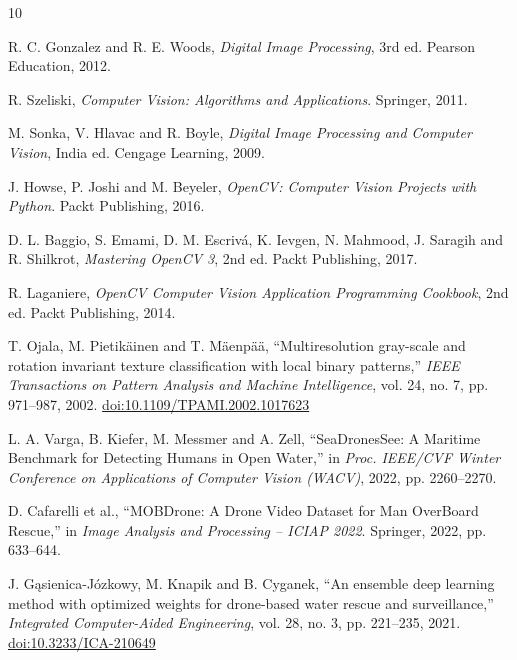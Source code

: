 \documentclass[11pt,a4paper]{article}
\begin{document}
\begin{thebibliography}{10}

 R. C. Gonzalez and R. E. Woods, \emph{Digital Image Processing}, 3rd ed. Pearson Education, 2012.

 R. Szeliski, \emph{Computer Vision: Algorithms and Applications}. Springer, 2011.

 M. Sonka, V. Hlavac and R. Boyle, \emph{Digital Image Processing and Computer Vision}, India ed. Cengage Learning, 2009.

 J. Howse, P. Joshi and M. Beyeler, \emph{OpenCV: Computer Vision Projects with Python}. Packt Publishing, 2016.

 D. L. Baggio, S. Emami, D. M. Escriv\'a, K. Ievgen, N. Mahmood, J. Saragih and R. Shilkrot, \emph{Mastering OpenCV 3}, 2nd ed. Packt Publishing, 2017.

 R. Laganiere, \emph{OpenCV Computer Vision Application Programming Cookbook}, 2nd ed. Packt Publishing, 2014.

 T. Ojala, M. Pietik\"ainen and T. M\"aenp\"a\"a, ``Multiresolution gray-scale and rotation invariant texture classification with local binary patterns,'' \emph{IEEE Transactions on Pattern Analysis and Machine Intelligence}, vol. 24, no. 7, pp. 971--987, 2002. \href{https://doi.org/10.1109/TPAMI.2002.1017623}{doi:10.1109/TPAMI.2002.1017623}

 L. A. Varga, B. Kiefer, M. Messmer and A. Zell, ``SeaDronesSee: A Maritime Benchmark for Detecting Humans in Open Water,'' in \emph{Proc. IEEE/CVF Winter Conference on Applications of Computer Vision (WACV)}, 2022, pp. 2260--2270.

 D. Cafarelli et al., ``MOBDrone: A Drone Video Dataset for Man OverBoard Rescue,'' in \emph{Image Analysis and Processing -- ICIAP 2022}. Springer, 2022, pp. 633--644.

 J. G\k{a}sienica-J\'ozkowy, M. Knapik and B. Cyganek, ``An ensemble deep learning method with optimized weights for drone-based water rescue and surveillance,'' \emph{Integrated Computer-Aided Engineering}, vol. 28, no. 3, pp. 221--235, 2021. \href{https://doi.org/10.3233/ICA-210649}{doi:10.3233/ICA-210649}

\end{thebibliography}
\end{document}
